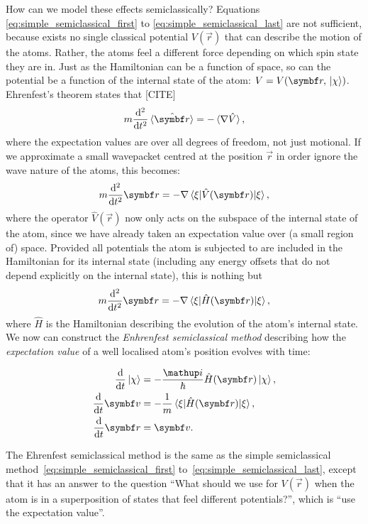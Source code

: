 How can we model these effects semiclassically? Equations \eqref{eq:simple_semiclassical_first} to \eqref{eq:simple_semiclassical_last} are not sufficient, because exists no single classical potential $V(\vec r)$ that can describe the motion of the atoms. Rather, the atoms feel a different force depending on which spin state they are in. Just as the Hamiltonian can be a function of space, so can the potential be a function of the internal state of the atom: $V = V(\vec{r}, \ket\chi)$. Ehrenfest's theorem states that [CITE]
\begin{align}
m\dv[2]{t}\ev{\hat{\vec r}} = - \ev{\nabla \hat V},
\end{align}
where the expectation values are over all degrees of freedom, not just motional. If we approximate a small wavepacket centred at the position $\vec r$ in order ignore the wave nature of the atoms, this becomes:
\begin{align}
m\dv[2]{t} \vec r = - \nabla \matrixel{\xi}{\hat V(\vec r)}{\xi},
\end{align}
where the operator $\hat V(\vec r)$ now only acts on the subspace of the internal state of the atom, since we have already taken an expectation value over (a small region of) space. Provided all potentials the atom is subjected to are included in the Hamiltonian for its internal state (including any energy offsets that do not
depend explicitly on the internal state), this is nothing but
\begin{align}
m\dv[2]{t} \vec r = - \nabla \matrixel{\xi}{\hat H(\vec r)}{\xi},
\end{align}
where $\hat H$ is the Hamiltonian describing the evolution of the atom's internal state. We now can construct the \emph{Enhrenfest semiclassical method} describing how the \emph{expectation value} of a well localised atom's position evolves with time:

\begin{align}\label{eq:ehrenfest_semiclassical_first}
\dv{t}\ket\chi &= -\frac\ii\hbar \hat H(\vec r)\ket\chi,\\
\dv{t}\vec v &= -\frac1m\matrixel{\xi}{\hat H(\vec r)}{\xi},\\
\dv{t}\vec r &= \vec v\label{eq:ehrenfest_semiclassical_last}.
\end{align}

The Ehrenfest semiclassical method is the same as the simple semiclassical method~\eqref{eq:simple_semiclassical_first} to~\eqref{eq:simple_semiclassical_last}, except that it has an answer to the question ``What should we use for $V(\vec r)$ when the atom is in a superposition of states that feel different potentials?'', which is ``use the expectation value''. 

